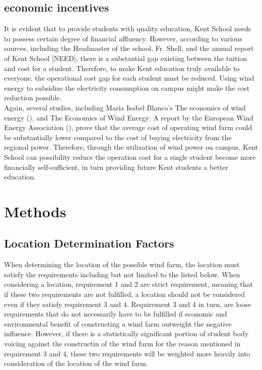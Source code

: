 \documentclass[review]{elsarticle}
\begin{document}
\subsection{economic incentives}
\label{sec:intro:econincentives}
It is evident that to provide students with quality education, Kent School needs to possess certain degree of financial affluency. However, according to various sources, 
including the Headmaster of the school, Fr. Shell, and the annual report of Kent School [NEED], there is a substantial gap existing between the tuition and cost for a 
student. Therefore, to make Kent education truly available to everyone, the operational cost gap for each student must be reduced. Using wind energy to subsidize the 
electricity consumption on campus might make the cost reduction possible.
\\\indent Again, several studies, including Maria Isabel Blanco’s The economics of wind energy (\cite{maria_wind_energy_economics}), and The Economics of Wind Energy: 
A report by the European Wind Energy Association (\cite{european_wind_energy_association_report}), prove that the average cost of operating wind farm could be substantially 
lower compared to the cost of buying electricity from the regional power. Therefore, through the utilization of wind power on campus, Kent School can possibility reduce the 
operation cost for a single student become more financially self-sufficient, in turn providing future Kent students a better education.   


\section{Methods}
\label{sec:methods}

\subsection{Location Determination Factors}
When determining the location of the possible wind farm, the location must satisfy the requirements including but not limited to the listed below. When considering a 
location, requirement 1 and 2 are strict requirement, meaning that if these two requirements are not fulfilled, a location should not be considered even if they satisfy 
requirement 3 and 4.
Requirement 3 and 4 in turn, are loose requirements that do not necessarily have to be fulfilled if economic and environmental benefit of constructing a wind farm outweight 
the negative influence. However, if there is a statistically significant portion of student body voicing against the constructin of the wind farm for the reason mentioned 
in requirement 3 and 4, 
these two requirements will be weighted more heavily into consideration of the location of the wind farm.
\end{document}
